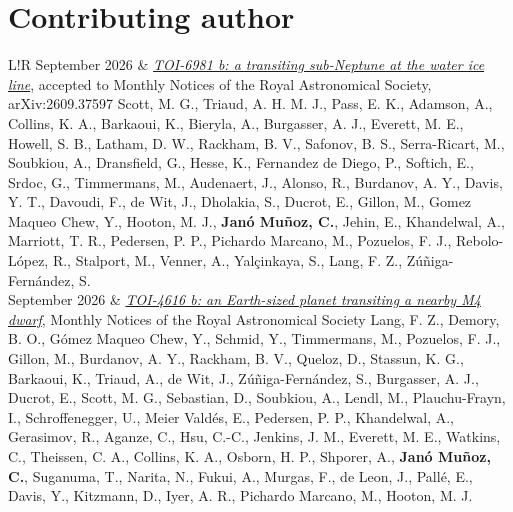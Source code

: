 \documentclass{article}
\newcommand{\me}{\textbf{Janó Muñoz, C.}}
\newcommand{\authlist}[1]{{\footnotesize #1}}
\begin{document}
\section*{Contributing author}
\begin{longtable}{L!{\vrule}R}
    September 2026 &
    \href{https://ui.adsabs.harvard.edu/abs/2026arXiv260937597S/abstract}{\textit{TOI-6981 b: a transiting sub-Neptune at the water ice line}},
    accepted to Monthly Notices of the Royal Astronomical Society, arXiv:2609.37597 \newline
    \authlist{Scott, M. G., Triaud, A. H. M. J., Pass, E. K., Adamson, A., Collins, K. A., Barkaoui, K., Bieryla, A., Burgasser, A. J., Everett, M. E., Howell, S. B., Latham, D. W., Rackham, B. V., Safonov, B. S., Serra-Ricart, M., Soubkiou, A., Dransfield, G., Hesse, K., Fernandez de Diego, P., Softich, E., Srdoc, G., Timmermans, M., Audenaert, J., Alonso, R., Burdanov, A. Y., Davis, Y. T., Davoudi, F., de Wit, J., Dholakia, S., Ducrot, E., Gillon, M., Gomez Maqueo Chew, Y., Hooton, M. J., \me, Jehin, E., Khandelwal, A., Marriott, T. R., Pedersen, P. P., Pichardo Marcano, M., Pozuelos, F. J., Rebolo-López, R., Stalport, M., Venner, A., Yalçinkaya, S., Lang, F. Z., Zúñiga-Fernández, S.} \\ %

    September 2026 &
    \href{https://ui.adsabs.harvard.edu/abs/2026MNRAS.tmp.1622L/abstract}{\textit{TOI-4616 b: an Earth-sized planet transiting a nearby M4 dwarf}},
    Monthly Notices of the Royal Astronomical Society \newline
    \authlist{Lang, F. Z., Demory, B. O., Gómez Maqueo Chew, Y., Schmid, Y., Timmermans, M., Pozuelos, F. J., Gillon, M., Burdanov, A. Y., Rackham, B. V., Queloz, D., Stassun, K. G., Barkaoui, K., Triaud, A., de Wit, J., Zúñiga-Fernández, S., Burgasser, A. J., Ducrot, E., Scott, M. G., Sebastian, D., Soubkiou, A., Lendl, M., Plauchu-Frayn, I., Schroffenegger, U., Meier Valdés, E., Pedersen, P. P., Khandelwal, A., Gerasimov, R., Aganze, C., Hsu, C.-C., Jenkins, J. M., Everett, M. E., Watkins, C., Theissen, C. A., Collins, K. A., Osborn, H. P., Shporer, A., \me, Suganuma, T., Narita, N., Fukui, A., Murgas, F., de Leon, J., Pallé, E., Davis, Y., Kitzmann, D., Iyer, A. R., Pichardo Marcano, M., Hooton, M. J.} \\ %


\end{longtable}
\end{document}
